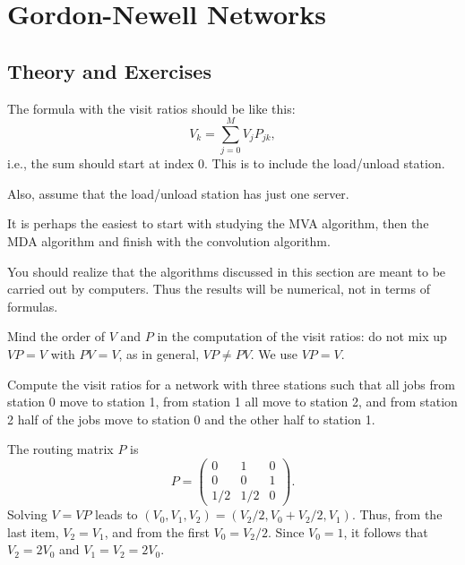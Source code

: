 
\section{Gordon-Newell Networks}
\label{sec:gordonNewell}


\subsection*{Theory and Exercises}



The formula with the visit ratios should be like this:
\begin{equation*}
  V_k = \sum_{j=0}^M V_j P_{jk}, 
\end{equation*}
i.e., the sum should start at index 0. This is to include the
load/unload station.

Also, assume that the load/unload station has just one server.

It is perhaps the easiest to start with studying the MVA algorithm,
then the MDA algorithm and finish with the convolution algorithm.

You should realize that the algorithms discussed in this section are
meant to be carried out by computers. Thus the results will be
numerical, not in terms of formulas.

Mind the order of $V$ and $P$ in the computation of the visit ratios:
do not mix up $VP=V$ with $PV=V$, as in general, $VP \neq PV$.  We use
$VP=V$.


\begin{exercise}\label{ex:mva}
  Compute the visit ratios for a network with three stations such that all jobs from station 0 move to station 1, from station 1 all move to station 2, and from station 2 half of the jobs move to station 0 and the other half to station 1. 
  \begin{solution}
    The routing matrix $P$ is
    \begin{equation*}
      P = 
      \begin{pmatrix}
        0 & 1 & 0 \\
0& 0 & 1 \\
1/2 & 1/2 & 0
      \end{pmatrix}.
    \end{equation*}
    Solving $V=VP$ leads to
    $(V_0, V_1, V_2) = (V_2/2, V_0 + V_2/2, V_1)$. Thus, from the last
    item, $V_2 = V_1$, and from the first $V_0 = V_2/2$. Since
    $V_0=1$, it follows that $V_2 = 2V_0$ and $V_1=V_2=2 V_0$.
  \end{solution}
\end{exercise}


